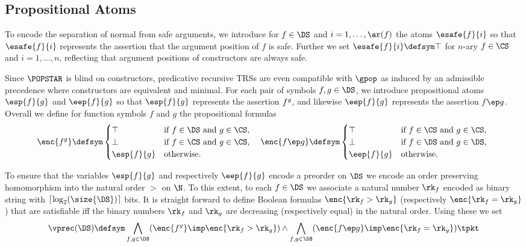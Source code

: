 \documentclass{LMCS}
\begin{document}
\subsection{Propositional Atoms}
To encode the separation of normal from safe arguments, we
introduce for $f \in \DS$ and $i = 1, \dots, \ar(f)$ the atoms $\esafe{f}{i}$
so that $\esafe{f}{i}$ represents the assertion that the  argument position of $f$ is safe.
Further we set $\esafe{f}{i} \defsym \top$ for $n$-ary $f \in \CS$ and $i = 1,\dots,n$,
reflecting that argument positions of constructors are always safe. 

Since $\POPSTAR$ is blind on constructors, predicative 
recursive TRSs are even compatible with  $\gpop$
as induced by an admissible precedence where constructors are equivalent and minimal.
For each pair of symbols $f,g \in \DS$, we introduce
propositional atoms $\esp{f}{g}$ and $\eep{f}{g}$ so that $\esp{f}{g}$
represents the assertion $f \sp g$, and likewise 
$\eep{f}{g}$ represents the assertion $f \ep g$.
Overall we define for function symbols $f$ and $g$ the propositional formulas
\begin{equation*}
  \enc{f \sp g} \defsym 
  \begin{cases}
    \top & \text{if $f\in\DS$ and $g\in \CS$,} \\
    \bot & \text{if $f\in\CS$ and $g\in \CS$,} \\
    \esp{f}{g} & \text{otherwise.}
  \end{cases}
  \quad
  \enc{f \ep g} \defsym
  \begin{cases}
    \top & \text{if $f\in\CS$ and $g\in \CS$, } \\
    \bot & \text{if $f\in\DS$ and $g \in \DS$,} \\
    \eep{f}{g} & \text{otherwise.}
  \end{cases}
\end{equation*}

To ensure that the variables $\esp{f}{g}$ and respectively $\eep{f}{g}$ encode a preorder on $\DS$ 
we encode an order preserving homomorphism into the natural order $>$ on $\N$. 
To this extent, to each $f \in \DS$ we associate a natural number $\rk_f$ encoded as binary string
with $\lceil \log_2(\size{\DS}) \rceil$ bits. 
It is straight forward to define Boolean formulas $\enc{\rk_f > \rk_g}$ (respectively $\enc{\rk_f = \rk_g}$) that are satisfiable iff 
the binary numbers $\rk_f$ and $\rk_g$ are decreasing (respectively equal) in the natural order. Using these we set
\begin{equation*}
  \vprec(\DS)
  \defsym \bigwedge_{f,g \in \DS} (\enc{f \sp g} \imp \enc{\rk_f > \rk_g})
  \wedge \bigwedge_{f,g \in \DS} (\enc{f \ep g} \imp \enc{\rk_f = \rk_g})
  \tpkt
\end{equation*}
\end{document}
